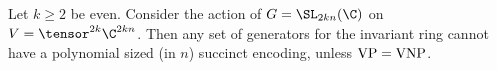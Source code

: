 \setcounter{theorem}{10}
\begin{theorem}\label{MC-cex}
Let $k \geq 2$ be even.
Consider the action of $G = \SL_{2kn}(\C)$ on $V = \tensor^{2k} \C^{2kn}$. Then any set of generators for the invariant ring cannot have a polynomial sized (in $n$) succinct encoding, unless ${\rm VP = VNP}$.
\end{theorem}
